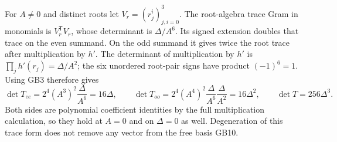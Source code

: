 \documentclass[11pt]{article}
\begin{document}
For $A\ne0$ and distinct roots let $V_r=(r_j^i)_{j,i=0}^3$.
The root-algebra trace Gram in monomials is $V_r^{\mathsf T}V_r$,
whose determinant is $\Delta/A^6$. Its signed extension
doubles that trace on the even summand. On the odd summand
it gives twice the root trace after multiplication by $h'$.
The determinant of multiplication by $h'$ is
$\prod_jh'(r_j)=\Delta/A^2$; the six unordered root-pair
signs have product $(-1)^6=1$. Using GB3 therefore gives
\begin{equation}
 \det T_{ee}=2^4(A^3)^2\frac{\Delta}{A^6}=16\Delta,\qquad
 \det T_{oo}=2^4(A^4)^2
           \frac{\Delta}{A^6}\frac{\Delta}{A^2}=16\Delta^2,
 \qquad \det T=256\Delta^3.
 \tag{GB19}
\end{equation}
Both sides are polynomial coefficient identities by the
full multiplication calculation, so they hold at $A=0$
and on $\Delta=0$ as well. Degeneration of this trace
form does not remove any vector from the free basis GB10.
\end{document}
